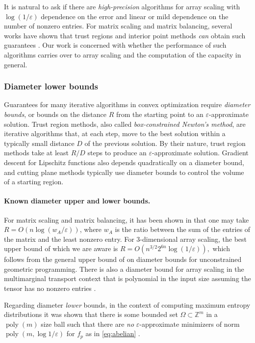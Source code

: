 \documentclass[10pt,a4paper]{article}
\numberwithin{equation}{section}
\newcommand{\poly}{\operatorname{poly}}
\newcommand{\ZZ}{\mathbb Z}
\newcommand{\eps}{\varepsilon}
\begin{document}
It is natural to ask if there are \emph{high-precision} algorithms for array scaling with $\log(1/\eps)$ dependence on the error and linear or mild dependence on the number of nonzero entries. For matrix scaling and matrix balancing, several works have shown that trust regions and interior point methods \emph{can} obtain such guarantees \cite{cohen2017matrix,allen2017much}.
Our work is concerned with whether the performance of such algorithms carries over to array scaling and the computation of the capacity in general.



\subsubsection{Diameter lower bounds}

Guarantees for many iterative algorithms in convex optimization require \emph{diameter bounds}, or bounds on the distance $R$ from the starting point to an $\eps$-approximate solution. Trust region methods, also called \emph{box-constrained Newton's method}, are iterative algorithms that, at each step, move to the best solution within a typically small distance $D$ of the previous solution. By their nature, trust region methods take at least $R/D$ steps to produce an $\eps$-approximate solution. Gradient descent for Lipschitz functions also depends quadratically on a diameter bound, and cutting plane methods typically use diameter bounds to control the volume of a starting region.

\paragraph{Known diameter upper and lower bounds.}
For matrix scaling and matrix balancing, it has been shown in \cite{cohen2017matrix} that one may take $R = O(n \log(w_A/\eps))$, where $w_A$ is the ratio between the sum of the entries of the matrix and the least nonzero entry. For $3$-dimensional array scaling, the best upper bound of which we are aware is $R = O(n^{3/2} 2^{6n} \log (1/\eps)),$ which follows from the general upper bound of \cite{straszak2017computing} on diameter bounds for unconstrained geometric programming. There is also a diameter bound for array scaling in the multimarginal transport context that is polynomial in the input size assuming the tensor has no nonzero entries \cite{lin2019complexity}.

Regarding diameter \emph{lower} bounds, in the context of computing maximum entropy distributions it was shown that there is some bounded set $\Omega \subset \ZZ^m$ in a $\poly(m)$ size ball such that there are \emph{no} $\eps$-approximate minimizers of norm $\poly(m, \log 1/\eps)$ for $f_p$ as in \cref{eq:abelian}  \cite{straszak2017computing}. 
\end{document}

